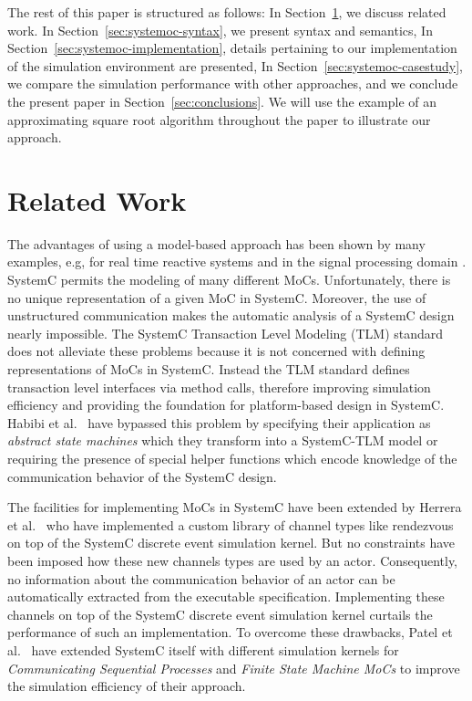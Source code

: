 The rest of this paper is structured as follows:
In Section~\ref{sec:related-work}, we discuss related work.
In Section~\ref{sec:systemoc-syntax}, we present \SysteMoC{} syntax and semantics,
In Section~\ref{sec:systemoc-implementation}, details pertaining to our implementation of the \SysteMoC{} simulation environment are presented,
In Section~\ref{sec:systemoc-casestudy}, we compare the \SysteMoC{} simulation performance with other approaches,
and we conclude the present paper in Section~\ref{sec:conclusions}.
We will use the example of an approximating square root algorithm throughout the paper to illustrate our approach.

\section{Related Work}\label{sec:related-work}

The advantages of using a model-based approach has been shown by many examples, e.g, for real time reactive systems \cite{BFMV06} and in the signal processing domain \cite{bhattacharyya,bb:2000a}.
SystemC \cite{glms:2002,systemc-lrm:2003} permits the modeling of many different MoCs.
Unfortunately, there is no unique representation of a given MoC in SystemC.
Moreover, the use of unstructured communication makes the automatic analysis of a SystemC design nearly impossible.
The SystemC Transaction Level Modeling (TLM) standard \cite{SystemC-TLM05} does not alleviate these problems because it is not concerned with defining representations of MoCs in SystemC.
Instead the TLM standard defines transaction level interfaces via method calls, therefore improving simulation efficiency and providing the foundation for platform-based design in SystemC.
Habibi et al.~\cite{HTSLM06, HMT06} have bypassed this problem by specifying their application as \emph{abstract state machines} which they transform into a SystemC-TLM model or requiring the presence of special helper functions which encode knowledge of the communication behavior of the SystemC design.

The facilities for implementing MoCs in SystemC have been extended by Herrera et al.~\cite{herrerasystemc:2004} who have implemented a custom library of channel types like rendezvous on top of the SystemC discrete event simulation kernel.
But no constraints have been imposed how these new channels types are used by an actor.
Consequently, no information about the communication behavior of an actor can be automatically extracted from the executable specification.
Implementing these channels on top of the SystemC discrete event simulation kernel curtails the performance of such an implementation.
To overcome these drawbacks, Patel et al.~\cite{PS:2005, PS:2004} have extended SystemC itself with different simulation kernels for \emph{Communicating Sequential Processes} and \emph{Finite State Machine MoCs} to improve the simulation efficiency of their approach.

